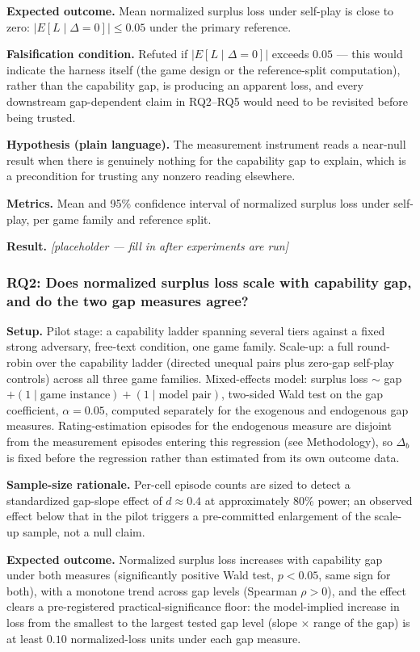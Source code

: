 \documentclass[11pt]{article}
\newcommand{\ph}{\textit{[placeholder --- fill in after experiments are run]}}
\begin{document}
\textbf{Expected outcome.} Mean normalized surplus loss under self-play is close to zero: $|E[L \mid \Delta = 0]| \leq 0.05$ under the primary reference.

\textbf{Falsification condition.} Refuted if $|E[L \mid \Delta = 0]|$ exceeds $0.05$ --- this would indicate the harness itself (the game design or the reference-split computation), rather than the capability gap, is producing an apparent loss, and every downstream gap-dependent claim in RQ2--RQ5 would need to be revisited before being trusted.

\textbf{Hypothesis (plain language).} The measurement instrument reads a near-null result when there is genuinely nothing for the capability gap to explain, which is a precondition for trusting any nonzero reading elsewhere.

\textbf{Metrics.} Mean and 95\% confidence interval of normalized surplus loss under self-play, per game family and reference split.

\textbf{Result.} \ph

\subsubsection{RQ2: Does normalized surplus loss scale with capability gap, and do the two gap measures agree?}
\textbf{Setup.} Pilot stage: a capability ladder spanning several tiers against a fixed strong adversary, free-text condition, one game family. Scale-up: a full round-robin over the capability ladder (directed unequal pairs plus zero-gap self-play controls) across all three game families. Mixed-effects model: surplus loss $\sim$ gap $+ (1 \mid \text{game instance}) + (1 \mid \text{model pair})$, two-sided Wald test on the gap coefficient, $\alpha = 0.05$, computed separately for the exogenous and endogenous gap measures. Rating-estimation episodes for the endogenous measure are disjoint from the measurement episodes entering this regression (see Methodology), so $\Delta_b$ is fixed before the regression rather than estimated from its own outcome data.

\textbf{Sample-size rationale.} Per-cell episode counts are sized to detect a standardized gap-slope effect of $d \approx 0.4$ at approximately 80\% power; an observed effect below that in the pilot triggers a pre-committed enlargement of the scale-up sample, not a null claim.

\textbf{Expected outcome.} Normalized surplus loss increases with capability gap under both measures (significantly positive Wald test, $p < 0.05$, same sign for both), with a monotone trend across gap levels (Spearman $\rho > 0$), and the effect clears a pre-registered practical-significance floor: the model-implied increase in loss from the smallest to the largest tested gap level (slope $\times$ range of the gap) is at least $0.10$ normalized-loss units under each gap measure.
\end{document}
